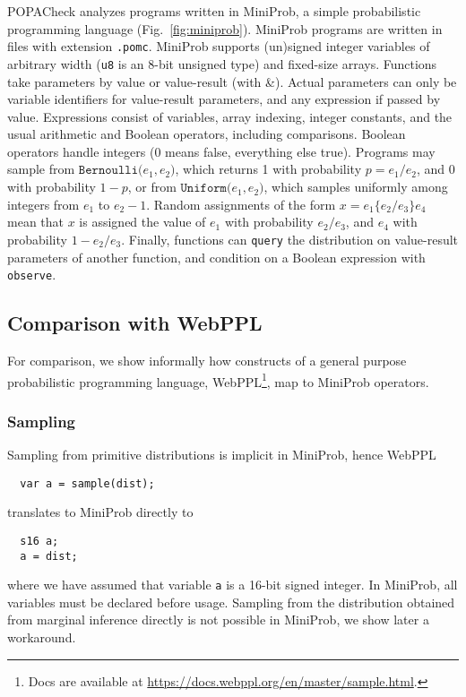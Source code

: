 \documentclass[9pt,a4paper]{article}
\begin{document}
POPACheck analyzes programs written in MiniProb, a simple probabilistic programming language (Fig.~\ref{fig:miniprob}). MiniProb programs are written in files with extension \verb|.pomc|.
MiniProb supports (un)signed integer variables of arbitrary width
(\texttt{u8} is an 8-bit unsigned type) and fixed-size arrays.
Functions take parameters by value or value-result (with \&).
Actual parameters can only be variable identifiers for value-result parameters,
and any expression if passed by value.
Expressions consist of variables, array indexing, integer constants, and the usual arithmetic and Boolean operators, including comparisons.
Boolean operators handle integers (0 means false, everything else true).
Programs may sample from $\texttt{Bernoulli(} e_1, e_2 \texttt{)}$,
which returns 1 with probability $p = e_1 / e_2$, and 0 with probability $1-p$,
or from $\texttt{Uniform(} e_1, e_2 \texttt{)}$,
which samples uniformly among integers from $e_1$ to $e_2 - 1$.
Random assignments of the form $x = e_1 \{ e_2 / e_3 \} e_4$ mean that $x$ is assigned
the value of $e_1$ with probability $e_2 / e_3$, and $e_4$ with probability $1 - e_2 / e_3$.
Finally, functions can \texttt{query} the distribution on value-result parameters of another function, and condition on a Boolean expression with \texttt{observe}.

\subsection{Comparison with WebPPL}
For comparison, we show informally how constructs of a general purpose probabilistic programming language, WebPPL\footnote{Docs are available at \url{https://docs.webppl.org/en/master/sample.html}.},
map to MiniProb operators.
\subsubsection{Sampling}
Sampling from primitive distributions is implicit in MiniProb, hence WebPPL
\begin{verbatim}
  var a = sample(dist);
\end{verbatim}
translates to MiniProb directly to 
\begin{verbatim}
  s16 a;
  a = dist;
\end{verbatim}
where we have assumed that variable \texttt{a} is a 16-bit signed integer. 
In MiniProb, all variables  must be declared before usage.
Sampling from the distribution obtained from marginal inference directly is not possible in MiniProb, we show later a workaround.
\end{document}
